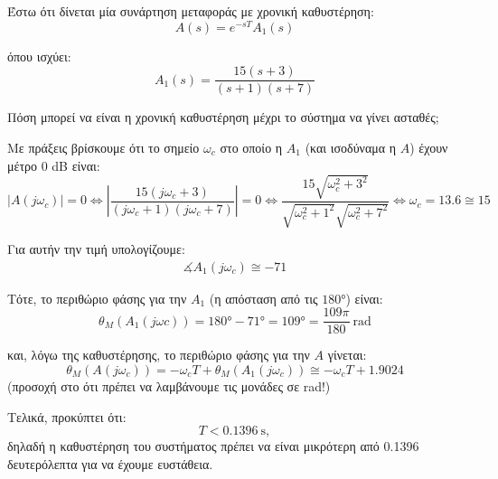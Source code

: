 \documentclass[11pt,a4paper,notitlepage,fleqn,final]{article}
\begin{document}
\begin{exercise}[Παράδειγμα]
Έστω ότι δίνεται μία συνάρτηση μεταφοράς με χρονική καθυστέρηση:
\[
A(s) = e^{-sT} A_1(s)
\]

όπου ισχύει:
\[
A_1(s) = \frac{15(s+3)}{(s+1)(s+7)}
\]

Πόση μπορεί να είναι η χρονική καθυστέρηση μέχρι το σύστημα
να γίνει ασταθές;

\tcblower
Με πράξεις βρίσκουμε ότι το σημείο \( \omega_c \) στο οποίο η \( A_1 \) (και
ισοδύναμα η \( A \)) έχουν μέτρο 0 dB είναι:
\[
\left|A(j\omega_c)\right| = 0
\iff \left|\frac{15(j\omega_c + 3)}{(j\omega_c+1)(j\omega_c+7)}\right| = 0
\iff \frac{15\sqrt{\omega_c^2 + 3^2}}{\sqrt{\omega_c^2 + 1^2}\sqrt{\omega_c^2 + 7^2}}
\iff
\omega_c = 13.6 \cong 15
\]

Για αυτήν την τιμή υπολογίζουμε:
\begin{align*}
	\measuredangle A_1(j\omega_c) \cong -71
\end{align*}

Τότε, το περιθώριο φάσης
για την \( A_1 \) (η απόσταση από τις \( \ang{180} \)) είναι:
\[
\theta_M\left( A_1(j\omega c) \right)
= \ang{180} - \ang{71} = \ang{109}
= \frac{109π}{180} \ \mathrm{rad}
\]

και, λόγω της καθυστέρησης, το περιθώριο φάσης για την \( A \)
γίνεται:
\[
\theta_M\left( A(j\omega_c) \right)
= -\omega_c T + \theta_M \left( A_1(j\omega_c) \right)
\cong -\omega_c T + 1.9024
\]
(προσοχή στο ότι πρέπει να λαμβάνουμε τις μονάδες σε rad!)

Τελικά, προκύπτει ότι:
\[
T < \SI{0.1396}{\second},
\]
δηλαδή η καθυστέρηση του συστήματος πρέπει να είναι μικρότερη από
0.1396 δευτερόλεπτα για να έχουμε ευστάθεια.

\end{exercise}
\end{document}
